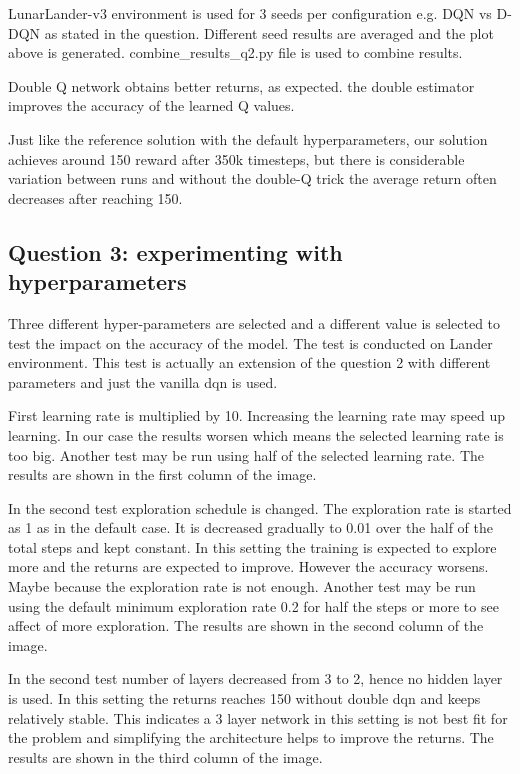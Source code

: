 \documentclass[11pt]{article}
\begin{document}
    LunarLander-v3 environment is used for 3 seeds per configuration e.g. DQN vs D-DQN as stated in the question.
    Different seed results are averaged and the plot above is generated.
    combine\_results\_q2.py file is used to combine results.

    Double Q network obtains better returns, as expected.
    the double estimator improves the accuracy of the learned Q values.

    Just like the reference solution with the default hyperparameters, our solution achieves around 150 reward after 350k timesteps, but there is considerable  variation between runs and without the double-Q trick the average return often decreases after reaching 150.

    \subsection*{Question 3: experimenting with hyperparameters}

    Three different hyper-parameters are selected and a different value is selected to test the impact on the accuracy of the model.
    The test is conducted on Lander environment.
    This test is actually an extension of the question 2 with different parameters and just the vanilla dqn is used.


    First learning rate is multiplied by 10.
    Increasing the learning rate may speed up learning.
    In our case the results worsen which means the selected learning rate is too big.
    Another test may be run using half of the selected learning rate.
    The results are shown in the first column of the image.

    In the second test exploration schedule is changed.
    The exploration rate is started as 1 as in the default case.
    It is decreased gradually to 0.01 over the half of the total steps and kept constant.
    In this setting the training is expected to explore more and the returns are expected to improve.
    However the accuracy worsens.
    Maybe because the exploration rate is not enough.
    Another test may be run using the default minimum exploration rate 0.2 for half the steps or more to see affect of more exploration.
    The results are shown in the second column of the image.

    In the second test number of layers decreased from 3 to 2, hence no hidden layer is used.
    In this setting the returns reaches 150 without double dqn and keeps relatively stable.
    This indicates a 3 layer network in this setting is not best fit for the problem and simplifying the architecture helps to improve the returns.
    The results are shown in the third column of the image.
\end{document}
